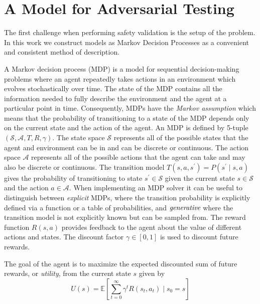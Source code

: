 \section{A Model for Adversarial Testing}
The first challenge when performing safety validation is the setup of the problem. In this work we construct models as Markov Decision Processes as a convenient and consistent method of description. 

A Markov decision process (MDP) is a model for sequential decision-making problems where an agent repeatedly takes actions in an environment which evolves stochastically over time. The state of the MDP contains all the information needed to fully describe the environment and the agent at a particular point in time. Consequently, MDPs have the \emph{Markov assumption} which means that the probability of transitioning to a state of the MDP depends only on the current state and the action of the agent. An MDP is defined by 5-tuple $(\mathcal{S}, \mathcal{A}, T, R, \gamma)$. The state space $\mathcal{S}$ represents all of the possible states that the agent and environment can be in and can be discrete or continuous. The action space $\mathcal{A}$ represents all of the possible actions that the agent can take and may also be discrete or continuous. The transition model $T(s, a, s^\prime) = P(s^\prime \mid s, a)$ gives the probability of transitioning to state $s^\prime \in \mathcal{S}$ given the current state $s \in \mathcal{S}$ and the action $a \in \mathcal{A}$. When implementing an MDP solver it can be useful to distinguish between \emph{explicit} MDPs, where the transition probability is explicitly defined via a function or a table of probabilities, and $\emph{generative}$ where the transition model is not explicitly known but can be sampled from. The reward function $R(s,a)$ provides feedback to the agent about the value of different actions and states. The discount factor $\gamma \in [0,1]$ is used to discount future rewards.

The goal of the agent is to maximize the expected discounted sum of future rewards, or \emph{utility}, from the current state $s$ given by
\begin{equation}
    U(s) = \mathbb{E}\left[ \sum_{t=0}^\infty \gamma^t R(s_t, a_t) \mid s_0 = s \right]
\end{equation}


